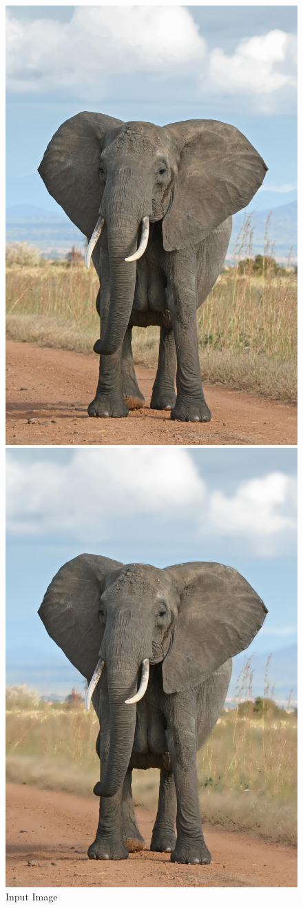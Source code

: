 \documentclass[12pt]{article}
\begin{document}
\begin{figure}[!htb]
    \begin{minipage}{0.48\textwidth}
        \centering
        \includegraphics[width=0.75\linewidth]{large_elephant.jpg}
        \caption{Input Image}
    \end{minipage}\hfill
    \begin{minipage}{0.48\textwidth}
        \centering
        \includegraphics[width=0.75\linewidth]{large_elephant_portrait.jpg}

\end{minipage}
\end{figure}
\end{document}
